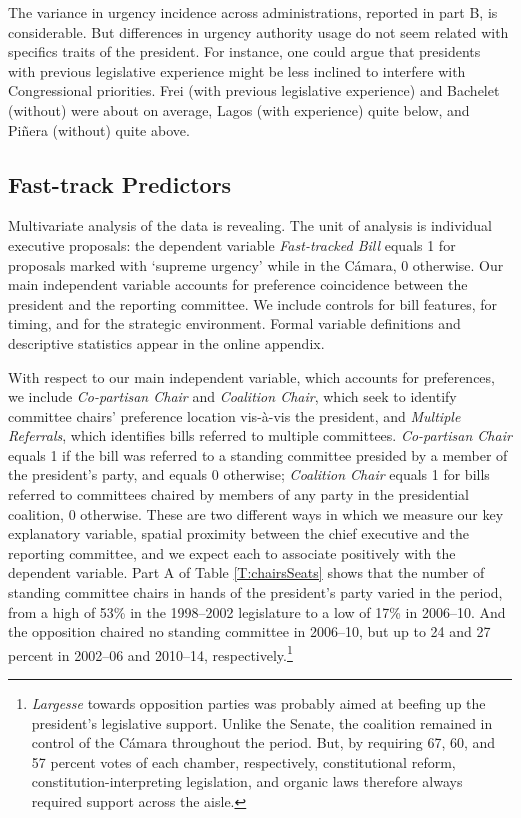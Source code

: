 \documentclass[letter,12pt]{article}
\begin{document}
The variance in urgency incidence across administrations, reported in part B, is considerable. But differences in urgency authority usage do not seem related with specifics traits of the president. For instance, one could argue that presidents with previous legislative experience might be less inclined to interfere with Congressional priorities. Frei (with previous legislative experience) and Bachelet (without) were about on average, Lagos (with experience) quite below, and Piñera (without) quite above. %

\subsection*{Fast-track Predictors}

Multivariate analysis of the data is revealing. The unit of analysis is individual executive proposals: the dependent variable \emph{Fast-tracked Bill} equals 1 for proposals marked with `supreme urgency' while in the Cámara, 0 otherwise. Our main independent variable accounts for preference coincidence between the president and the reporting committee. We include controls for bill features, for timing, and for the strategic environment. Formal variable definitions and descriptive statistics appear in the online appendix.

With respect to our main independent variable, which accounts for preferences, we include \emph{Co-partisan Chair} and \emph{Coalition Chair}, which seek to identify committee chairs' preference location vis-\`a-vis the president, and \emph{Multiple Referrals}, which identifies bills referred to multiple committees. \emph{Co-partisan Chair} equals 1 if the bill was referred to a standing committee presided by a member of the president's party, and equals 0 otherwise; \emph{Coalition Chair} equals 1 for bills referred to committees chaired by members of any party in the presidential coalition, 0 otherwise. These are two different ways in which we measure our key explanatory variable, spatial proximity between the chief executive and the reporting committee, and we expect each to associate positively with the dependent variable. Part A of Table \ref{T:chairsSeats} shows that the number of standing committee chairs in hands of the president's party varied in the period, from a high of 53\% in the 1998--2002 legislature to a low of 17\% in 2006--10. And the opposition chaired no standing committee in 2006--10, but up to 24 and 27 percent in 2002--06 and 2010--14, respectively.\footnote{\emph{Largesse} towards opposition parties was probably aimed at beefing up the president's legislative support. Unlike the Senate, the coalition remained in control of the Cámara throughout the period. But, by requiring 67, 60, and 57 percent votes of each chamber, respectively, constitutional reform, constitution-interpreting legislation, and organic laws therefore always required support across the aisle.}
\end{document}
